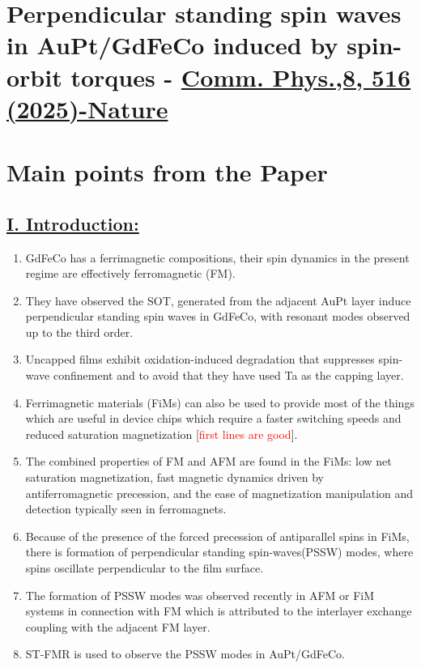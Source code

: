 \section{Perpendicular standing spin waves in AuPt/GdFeCo induced by spin-orbit torques - \href{https://doi.org/10.1038/s42005-025-02433-2}{Comm. Phys.,8, 516 (2025)-Nature}}

\section*{Main points from the Paper}
\subsection*{\underline{I. Introduction:}}
    \begin{enumerate}[1.]
        \item GdFeCo has a ferrimagnetic compositions, their spin dynamics in the present regime are effectively ferromagnetic (FM).
        \item They have observed the SOT, generated from the adjacent AuPt layer induce perpendicular standing spin waves in GdFeCo, with resonant modes observed up to the third order. 
        \item Uncapped films exhibit oxidation-induced degradation that suppresses spin-wave confinement and to avoid that they have used Ta as the capping layer. 
        \item Ferrimagnetic materials (FiMs) can also be used to provide most of the things which are useful in device chips which require a faster switching speeds and reduced saturation magnetization [\textcolor{red}{first lines are good}].
        \item The combined properties of FM and AFM are found in the FiMs: low net saturation magnetization, fast magnetic dynamics driven by antiferromagnetic precession, and the ease of magnetization manipulation and detection typically seen in ferromagnets.
        \item Because of the presence of the forced precession of antiparallel spins in FiMs, there is formation of perpendicular standing spin-waves(PSSW) modes, where spins oscillate perpendicular to the film surface.
        \item The formation of PSSW modes was observed recently in AFM or FiM systems in connection with FM which is attributed to the interlayer exchange coupling with the adjacent FM layer. 
        \item ST-FMR is used to observe the PSSW modes in AuPt/GdFeCo.

\end{enumerate}
